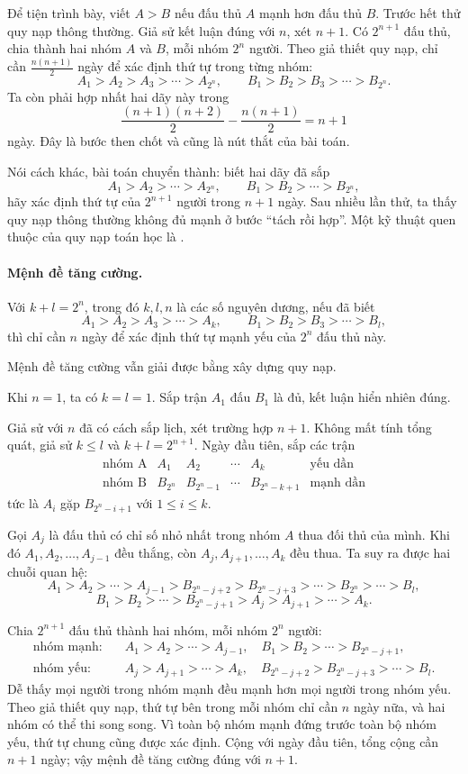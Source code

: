 \documentclass[11pt]{article}
\begin{document}
Để tiện trình bày, viết $A>B$ nếu đấu thủ $A$ mạnh hơn đấu thủ $B$.
Trước hết thử quy nạp thông thường. Giả sử kết luận đúng với $n$, xét
$n+1$. Có $2^{n+1}$ đấu thủ, chia thành hai nhóm $A$ và $B$, mỗi nhóm
$2^n$ người. Theo giả thiết quy nạp, chỉ cần $\frac{n(n+1)}{2}$ ngày để xác
định thứ tự trong từng nhóm:
\[
  A_1>A_2>A_3>\cdots>A_{2^n},
  \qquad
  B_1>B_2>B_3>\cdots>B_{2^n}.
\]
Ta còn phải hợp nhất hai dãy này trong
\[
  \frac{(n+1)(n+2)}{2}-\frac{n(n+1)}{2}=n+1
\]
ngày. Đây là bước then chốt và cũng là nút thắt của bài toán.

Nói cách khác, bài toán chuyển thành: biết hai dãy đã sắp
\[
  A_1>A_2>\cdots>A_{2^n},\qquad
  B_1>B_2>\cdots>B_{2^n},
\]
hãy xác định thứ tự của $2^{n+1}$ người trong $n+1$ ngày.
Sau nhiều lần thử, ta thấy quy nạp thông thường không đủ mạnh ở bước
``tách rồi hợp''. Một kỹ thuật quen thuộc của quy nạp toán học là
.

\paragraph{Mệnh đề tăng cường.}
Với $k+l=2^n$, trong đó $k,l,n$ là các số nguyên dương, nếu đã biết
\[
  A_1>A_2>A_3>\cdots>A_k,
  \qquad
  B_1>B_2>B_3>\cdots>B_l,
\]
thì chỉ cần $n$ ngày để xác định thứ tự mạnh yếu của $2^n$ đấu thủ này.

Mệnh đề tăng cường vẫn giải được bằng xây dựng quy nạp.

Khi $n=1$, ta có $k=l=1$. Sắp trận $A_1$ đấu $B_1$ là đủ, kết luận hiển
nhiên đúng.

Giả sử với $n$ đã có cách sắp lịch, xét trường hợp $n+1$. Không mất tính tổng
quát, giả sử $k\le l$ và $k+l=2^{n+1}$. Ngày đầu tiên, sắp các trận
\[
\begin{array}{c|cccc|c}
\text{nhóm A} & A_1 & A_2 & \cdots & A_k & \text{yếu dần}\\ \hline
\text{nhóm B} & B_{2^n} & B_{2^n-1} & \cdots & B_{2^n-k+1}
& \text{mạnh dần}
\end{array}
\]
tức là $A_i$ gặp $B_{2^n-i+1}$ với $1\le i\le k$.

Gọi $A_j$ là đấu thủ có chỉ số nhỏ nhất trong nhóm $A$ thua đối thủ của mình.
Khi đó $A_1,A_2,\ldots,A_{j-1}$ đều thắng, còn
$A_j,A_{j+1},\ldots,A_k$ đều thua. Ta suy ra được hai chuỗi quan hệ:
\[
  A_1>A_2>\cdots>A_{j-1}>
  B_{2^n-j+2}>B_{2^n-j+3}>\cdots>B_{2^n}> \cdots >B_l,
\]
\[
  B_1>B_2>\cdots>B_{2^n-j+1}>
  A_j>A_{j+1}>\cdots>A_k.
\]

Chia $2^{n+1}$ đấu thủ thành hai nhóm, mỗi nhóm $2^n$ người:
\[
\begin{aligned}
\text{nhóm mạnh:}\quad
&A_1>A_2>\cdots>A_{j-1},\quad
  B_1>B_2>\cdots>B_{2^n-j+1},\\
\text{nhóm yếu:}\quad
&A_j>A_{j+1}>\cdots>A_k,\quad
  B_{2^n-j+2}>B_{2^n-j+3}>\cdots>B_l.
\end{aligned}
\]
Dễ thấy mọi người trong nhóm mạnh đều mạnh hơn mọi người trong nhóm yếu.
Theo giả thiết quy nạp, thứ tự bên trong mỗi nhóm chỉ cần $n$ ngày nữa, và
hai nhóm có thể thi song song. Vì toàn bộ nhóm mạnh đứng trước toàn bộ nhóm
yếu, thứ tự chung cũng được xác định. Cộng với ngày đầu tiên, tổng cộng cần
$n+1$ ngày; vậy mệnh đề tăng cường đúng với $n+1$.
\end{document}
